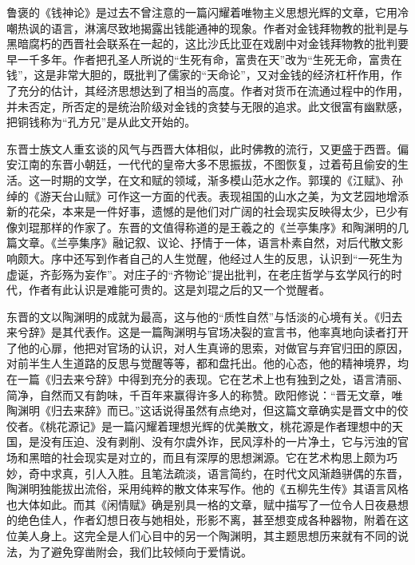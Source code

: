 鲁褒的《钱神论》是过去不曾注意的一篇闪耀着唯物主义思想光辉的文章，它用冷嘲热讽的语言，淋漓尽致地揭露出钱能通神的现象。作者对金钱拜物教的批判是与黑暗腐朽的西晋社会联系在一起的，这比沙氏比亚在戏剧中对金钱拜物教的批判要早一千多年。作者把孔圣人所说的“生死有命，富贵在天”改为“生死无命，富贵在钱”，这是非常大胆的，既批判了儒家的“天命论”，又对金钱的经济杠杆作用，作了充分的估计，其经济思想达到了相当的高度。作者对货币在流通过程中的作用，并未否定，所否定的是统治阶级对金钱的贪婪与无限的追求。此文很富有幽默感，把铜钱称为“孔方兄”是从此文开始的。

东晋士族文人重玄谈的风气与西晋大体相似，此时佛教的流行，又更盛于西晋。偏安江南的东晋小朝廷，一代代的皇帝大多不思振拔，不图恢复，过着苟且偷安的生活。这一时期的文学，在文和赋的领域，渐多模山范水之作。郭璞的《江赋》、孙绰的《游天台山赋》可作这一方面的代表。表现祖国的山水之美，为文艺园地增添新的花朵，本来是一件好事，遗憾的是他们对广阔的社会现实反映得太少，已少有像刘琨那样的作家了。东晋的文值得称道的是王羲之的《兰亭集序》和陶渊明的几篇文章。《兰亭集序》融记叙、议论、抒情于一体，语言朴素自然，对后代散文影响颇大。序中还写到作者自己的人生觉醒，他经过人生的反思，认识到“一死生为虚诞，齐彭殇为妄作”。对庄子的“齐物论”提出批判，在老庄哲学与玄学风行的时代，作者有此认识是难能可贵的。这是刘琨之后的又一个觉醒者。

东晋的文以陶渊明的成就为最高，这与他的“质性自然”与恬淡的心境有关。《归去来兮辞》是其代表作。这是一篇陶渊明与官场决裂的宣言书，他率真地向读者打开了他的心扉，他把对官场的认识，对人生真谛的思索，对做官与弃官归田的原因，对前半生人生道路的反思与觉醒等等，都和盘托出。他的心态，他的精神境界，均在一篇《归去来兮辞》中得到充分的表现。它在艺术上也有独到之处，语言清丽、简净，自然而又有韵味，千百年来赢得许多人的称赞。欧阳修说：“晋无文章，唯陶渊明《归去来辞》而已。”这话说得虽然有点绝对，但这篇文章确实是晋文中的佼佼者。《桃花源记》是一篇闪耀着理想光辉的优美散文，桃花源是作者理想中的天国，是没有压迫、没有剥削、没有尔虞外诈，民风淳朴的一片净土，它与污浊的官场和黑暗的社会现实是对立的，而且有深厚的思想渊源。它在艺术构思上颇为巧妙，奇中求真，引人入胜。且笔法疏淡，语言简约，在时代文风渐趋骈偶的东晋，陶渊明独能拔出流俗，采用纯粹的散文体来写作。他的《五柳先生传》其语言风格也大体如此。而其《闲情赋》确是别具一格的文章，赋中描写了一位令人日夜悬想的绝色佳人，作者幻想日夜与她相处，形影不离，甚至想变成各种器物，附着在这位美人身上。这完全是人们心目中的另一个陶渊明，其主题思想历来就有不同的说法，为了避免穿凿附会，我们比较倾向于爱情说。

